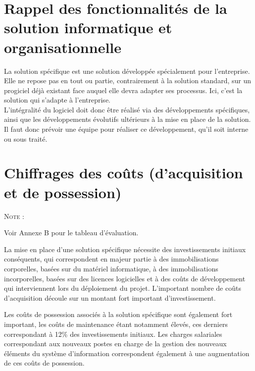 \section{Rappel des fonctionnalités de la solution informatique et organisationnelle}

La solution spécifique est une solution développée spécialement pour l’entreprise. Elle ne repose pas en tout ou partie, contrairement à la solution standard, sur un progiciel déjà existant face auquel elle devra adapter ses processus. Ici, c’est la solution qui s’adapte à l’entreprise. \\

L’intégralité du logiciel doit donc être réalisé via des développements spécifiques, ainsi que les développements évolutifs ultérieurs à la mise en place de la solution. Il faut donc prévoir une équipe pour réaliser ce développement, qu’il soit interne ou sous traité.

\section{Chiffrages des coûts (d'acquisition et de possession)}

\begin{shaded}
\noindent\textsc{Note :}

    Voir Annexe B pour le tableau d'évaluation.
\end{shaded}

La mise en place d’une solution spécifique nécessite des investissements initiaux conséquents, qui correspondent en majeur partie à des immobilisations corporelles, basées sur du matériel informatique, à des immobilisations incorporelles, basées sur des licences logicielles et à des coûts de développement qui interviennent lors du déploiement du projet. L’important nombre de coûts d’acquisition découle sur un montant fort important d’investissement.

Les coûts de possession associés à la solution spécifique sont également fort important, les coûts de maintenance étant notamment élevés, ces derniers correspondant à 12\% des investissements initiaux. Les charges salariales correspondant aux nouveaux postes en charge de la gestion des nouveaux éléments du système d’information correspondent également à une augmentation de ces coûts de possession.

